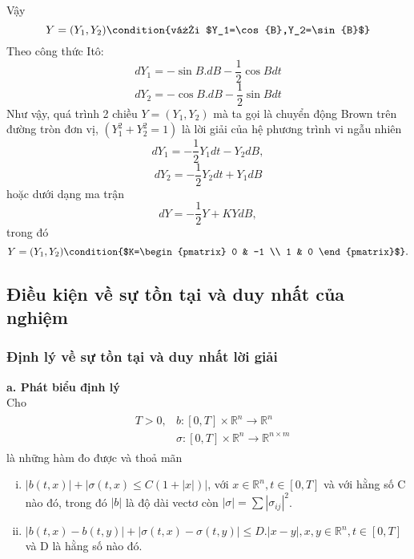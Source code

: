 \documentclass[14pt,a4paper]{article}
\numberwithin{equation}{section}
\begin{document}
Vậy
\begin{equation*}
	Y=(Y_1,Y_2) \condition{với $Y_1=\cos{B},Y_2=\sin{B}$}
\end{equation*}
Theo công thức Itô:
\begin{equation*}
	dY_1=-\sin{B.dB}-\dfrac{1}{2}\cos{B}dt
\end{equation*}
\begin{equation*}
	dY_2=-\cos{B.dB}-\dfrac{1}{2}\sin{B}dt
\end{equation*}
Như vậy, quá trình 2 chiều $Y=(Y_1,Y_2)$ mà ta gọi là chuyển động Brown trên đường tròn đơn vị, $(Y_1^2+Y_2^2=1)$ là lời giải của hệ phương trình vi ngẫu nhiên
\begin{equation*}
	dY_1=-\dfrac{1}{2}Y_1dt-Y_2dB,
\end{equation*}
\begin{equation*}
	dY_2=-\dfrac{1}{2}Y_2dt+Y_1dB
\end{equation*}
hoặc dưới dạng ma trận
\begin{equation*}
	dY=-\dfrac{1}{2}Y+KYdB,
\end{equation*} 
trong đó
\begin{equation*}
	Y=(Y_1,Y_2)\condition{$K=\begin{pmatrix} 0 & -1 \\ 1 & 0 \end{pmatrix}$}.
\end{equation*}
\subsection{Điều kiện về sự tồn tại và duy nhất của nghiệm}
\subsubsection{Định lý về sự tồn tại và duy nhất lời giải}
\textbf{a. Phát biểu định lý}\\
Cho
\begin{align}
	& \begin{aligned}
	T>0,& b:[0,T]\times\mathbb{R}^n\rightarrow\mathbb{R}^n\\
	& \sigma:[0,T]\times\mathbb{R}^n\rightarrow\mathbb{R}^{n\times m}
\end{aligned}
\end{align}
là những hàm đo được và thoả mãn
\begin{enumerate}[(i)]
	\item $|b(t,x)|+|\sigma(t,x)\leq C(1+|x|)|$, với $x\in\mathbb{R}^n,t\in[0,T]$ và với hằng số C nào đó, trong đó $|b|$ là độ dài vectơ còn $|\sigma|=\sum{|\sigma_{ij}|^2}$.
	\item $|b(t,x)-b(t,y)|+|\sigma(t,x)-\sigma(t,y)|\leq D.|x-y|,x,y\in\mathbb{R}^n,t\in[0,T]$ và D là hằng số nào đó.
\end{enumerate}
\end{document}
